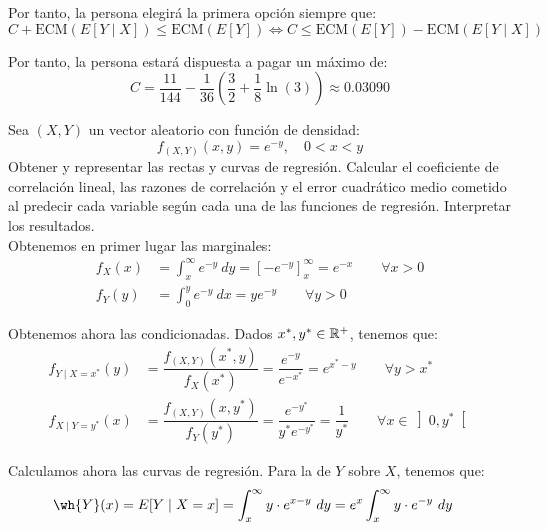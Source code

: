 \begin{ejercicio}
\begin{enumerate}
        Por tanto, la persona elegirá la primera opción siempre que:
        \begin{equation*}
            C+\text{ECM}(E[Y\mid X]) \leq \text{ECM}(E[Y])
            \Longleftrightarrow C\leq \text{ECM}(E[Y]) - \text{ECM}(E[Y\mid X])
        \end{equation*}

        Por tanto, la persona estará dispuesta a pagar un máximo de:
        \begin{equation*}
            C = \dfrac{11}{144}-\dfrac{1}{36}\left(\dfrac{3}{2} + \dfrac{1}{8}\ln(3)\right) \approx 0.03090
        \end{equation*}
    \end{enumerate}
\end{ejercicio}

\begin{ejercicio}
    Sea $(X,Y)$ un vector aleatorio con función de densidad:
    \begin{equation*}
        f_{(X,Y)}(x, y) = e^{-y}, \quad 0 < x < y
    \end{equation*}
    Obtener y representar las rectas y curvas de regresión. Calcular el coeficiente de correlación lineal, las razones de correlación y el error cuadrático medio cometido al predecir cada variable según cada una de las funciones de regresión. Interpretar los resultados.\\

    Obtenemos en primer lugar las marginales:
    \begin{align*}
        f_X(x) &= \int_{x}^{\infty} e^{-y} \ dy = \left[-e^{-y}\right]_{x}^{\infty} = e^{-x} \qquad \forall x>0\\
        f_Y(y) &= \int_{0}^{y} e^{-y} \ dx = ye^{-y} \qquad \forall y>0
    \end{align*}

    Obtenemos ahora las condicionadas. Dados $x^*, y^*\in\mathbb{R}^+$, tenemos que:
    \begin{align*}
        f_{Y\mid X=x^*}(y) &= \dfrac{f_{(X,Y)}(x^*, y)}{f_X(x^*)} = \dfrac{e^{-y}}{e^{-x^*}} = e^{x^*-y} \qquad \forall y>x^*\\
        f_{X\mid Y=y^*}(x) &= \dfrac{f_{(X,Y)}(x, y^*)}{f_Y(y^*)} = \dfrac{e^{-y^*}}{y^*e^{-y^*}} = \dfrac{1}{y^*} \qquad \forall x\in \left]0, y^*\right[
    \end{align*}

    Calculamos ahora las curvas de regresión. Para la de $Y$ sobre $X$, tenemos que:
    \begin{align*}
        \wh{Y}(x) &= E[Y\mid X=x] = \int_{x}^{\infty} y\cdot e^{x-y} \ dy = e^x\int_{x}^{\infty} y\cdot e^{-y} \ dy
    \end{align*}


\end{ejercicio}
